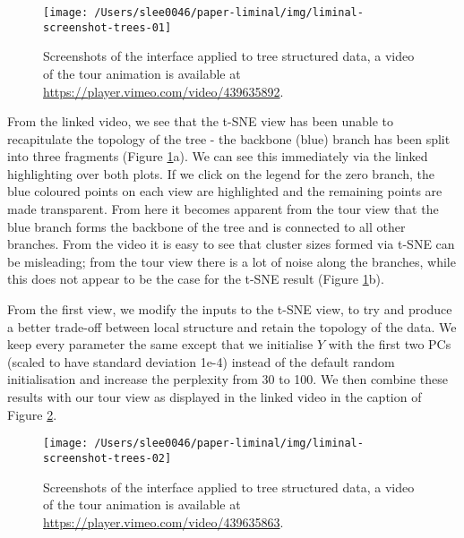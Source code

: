 \documentclass[article,notitle]{jdssv}
\begin{document}
\begin{figure}

{\centering \texttt{[image: /Users/slee0046/paper-liminal/img/liminal-screenshot-trees-01]} 

}

\caption{Screenshots of the  interface applied to tree structured data, a video of the tour animation is available at \url{https://player.vimeo.com/video/439635892}.}\label{fig:trees-01}
\end{figure}

From the linked video, we see that the t-SNE view has been unable to
recapitulate the topology of the tree - the backbone (blue) branch has been
split into three fragments (Figure \ref{fig:trees-01}a). We can see
this immediately via the linked highlighting over both
plots. If we click on the legend for the zero branch, the blue coloured points
on each view are highlighted and the remaining points are made transparent.
From here it becomes apparent from the tour view that the blue branch forms
the backbone of the tree and is connected to all other branches. From the video
it is easy to see that cluster sizes formed via t-SNE can be misleading; from the tour
view there is a lot of noise along the branches, while this does not appear to
be the case for the t-SNE result (Figure \ref{fig:trees-01}b).

From the first view, we modify the inputs to the t-SNE view, to try and produce
a better trade-off between local structure and retain the topology of the data.
We keep every parameter the same except that we initialise \(Y\) with the first
two PCs (scaled to have standard deviation 1e-4) instead of the default random
initialisation and increase the perplexity from 30 to 100. We then combine
these results with our tour view as displayed in the linked video in the caption
of Figure \ref{fig:trees-02}.



\begin{figure}

{\centering \texttt{[image: /Users/slee0046/paper-liminal/img/liminal-screenshot-trees-02]} 

}

\caption{Screenshots of the  interface applied to tree structured data, a video of the tour animation is available at \url{https://player.vimeo.com/video/439635863}.}\label{fig:trees-02}
\end{figure}
\end{document}
